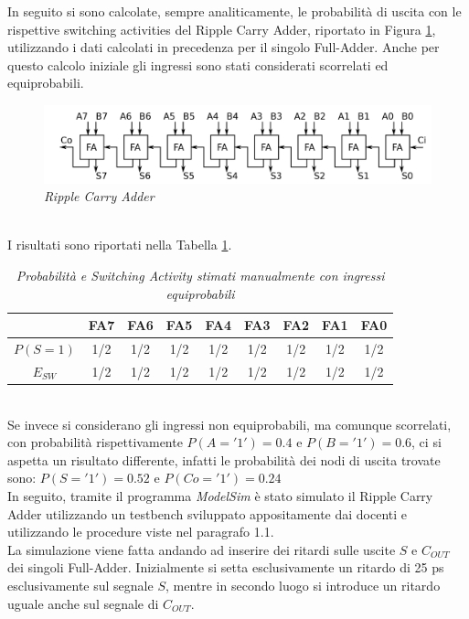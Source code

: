\noindent In seguito si sono calcolate, sempre analiticamente, le probabilità di uscita con le rispettive switching activities del Ripple Carry Adder, riportato in Figura \ref{ripple}, utilizzando i dati calcolati in precedenza per il singolo Full-Adder. Anche per questo calcolo iniziale gli ingressi sono stati considerati scorrelati ed equiprobabili.
\begin{figure}[!htb]
	\centering
	\includegraphics[scale=0.9]{immagini/ripple}
	\caption{\textit{Ripple Carry Adder}}
	\label{ripple}
\end{figure} \\
I risultati sono riportati nella Tabella \ref{Tab1_3}.\\
\begin{table}[!h]\footnotesize
	\centering
	\begin{tabular}{|c|c|c|c|c|c|c|c|c|}
		\hline
		&\textbf{FA7}& \textbf{FA6}& \textbf{FA5} &\textbf{FA4}&\textbf{FA3}&\textbf{FA2}&\textbf{FA1}&\textbf{FA0}\\
		\hline
		$P(S=1)$&1/2 &1/2&1/2&1/2&1/2&1/2&1/2&1/2\\
		\hline
		$E_{SW}$&1/2&1/2&1/2&1/2&1/2&1/2&1/2&1/2\\
		\hline
	\end{tabular}
	\caption{\textit{Probabilità e Switching Activity stimati manualmente con ingressi equiprobabili}}
	\label{Tab1_3}
\end{table}
\\
\noindent Se invece si considerano gli ingressi non equiprobabili, ma comunque scorrelati, con probabilità rispettivamente $P(A='1')=0.4$ e $P(B='1')=0.6 $, ci si aspetta un risultato differente, infatti le probabilità dei nodi di uscita trovate sono: $P(S ='1')=0.52$ e $P(Co ='1')=0.24$ \\
In seguito, tramite il programma \textit{ModelSim} è stato simulato il Ripple Carry Adder utilizzando un testbench sviluppato appositamente dai docenti e utilizzando le procedure viste nel paragrafo 1.1.\\
La simulazione viene fatta andando ad inserire dei ritardi sulle uscite $S$ e $C_{OUT}$ dei singoli Full-Adder. Inizialmente si setta esclusivamente un ritardo di 25 ps esclusivamente sul segnale $S$, mentre in secondo luogo si introduce un ritardo uguale anche sul segnale di $C_{OUT}$.\\
